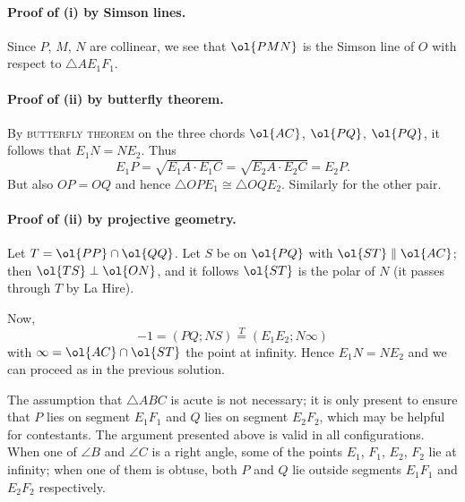 \documentclass[11pt]{scrartcl}
\begin{document}
\paragraph{Proof of (i) by Simson lines.}
Since $P$, $M$, $N$ are collinear,
we see that $\ol{PMN}$ is the Simson line of $O$
with respect to $\triangle AE_1F_1$.

\paragraph{Proof of (ii) by butterfly theorem.}
By \textsc{butterfly theorem}
on the three chords $\ol{AC}$, $\ol{PQ}$, $\ol{PQ}$,
it follows that $E_1N = NE_2$.
Thus \[ E_1P = \sqrt{E_1A \cdot E_1C} = \sqrt{E_2A \cdot E_2C} = E_2P. \]
But also $OP = OQ$ and hence
$\triangle OPE_1 \cong \triangle OQE_2$.
Similarly for the other pair.

\paragraph{Proof of (ii) by projective geometry.}
Let $T = \ol{PP} \cap \ol{QQ}$.
Let $S$ be on $\ol{PQ}$ with $\ol{ST} \parallel \ol{AC}$;
then $\ol{TS} \perp \ol{ON}$,
and it follows $\ol{ST}$ is the polar of $N$
(it passes through $T$ by La Hire).

Now, \[ -1 = (PQ;NS) \overset{T}{=} (E_1E_2;N\infty) \]
with $\infty = \ol{AC} \cap \ol{ST}$ the point at infinity.
Hence $E_1 N = N E_2$ and we can proceed as in the previous solution.

%

\begin{remark*}
The assumption that $\triangle ABC$ is acute is not necessary; it is only present to ensure that $P$ lies on segment $E_1F_1$ and $Q$ lies on segment $E_2F_2$, which may be helpful for contestants. The argument presented above is valid in all configurations. When one of $\angle B$ and $\angle C$ is a right angle, some of the points $E_1$, $F_1$, $E_2$, $F_2$ lie at infinity; when one of them is obtuse, both $P$ and $Q$ lie outside segments $E_1F_1$ and $E_2F_2$ respectively.
\end{remark*}
\end{document}
